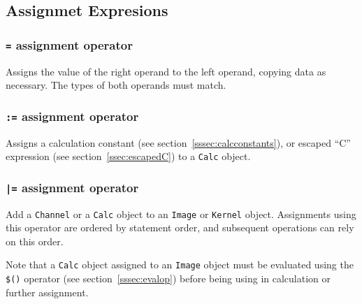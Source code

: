 \subsection{Assignmet Expresions}
\label{ssec:assignment}

\subsubsection{\texttt{=} assignment operator}
\label{sssec:equalop}
Assigns the value of the right operand to the left operand, copying data as necessary.
The types of both operands must match.

\subsubsection{\texttt{:=} assignment operator}
\label{sssec:colonequalop}
Assigns a calculation constant (see section~\ref{sssec:calcconstants}), or
escaped ``C'' expression (see section~\ref{ssec:escapedC}) to a \texttt{Calc}
object.

\subsubsection{\texttt{|=} assignment operator}
\label{sssec:barequalop}
Add a \texttt{Channel} or a \texttt{Calc} object to an \texttt{Image} or
\texttt{Kernel} object. Assignments using this operator are ordered by statement
order, and subsequent operations can rely on this order.

Note that a \texttt{Calc} object assigned to an \texttt{Image} object must be
evaluated using the \texttt{\$()} operator (see section~\ref{sssec:evalop}) before
being using in calculation or further assignment.

